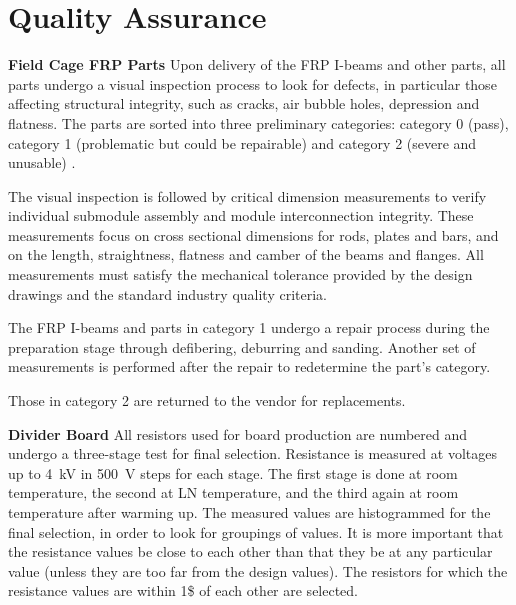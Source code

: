 \section{Quality Assurance}
\label{sec:fddp-hv-qa}

{\bf Field Cage FRP Parts} Upon delivery of the FRP I-beams and other parts, all parts undergo a visual inspection process to look for defects, in particular those affecting structural integrity, such as cracks, air bubble holes, depression and flatness. The parts are sorted into three preliminary categories: category 0 (pass), category 1 (problematic but could be repairable) and category 2 (severe and unusable) .

The visual inspection is followed by critical dimension measurements to verify individual submodule assembly and module interconnection integrity.  These measurements focus on cross sectional dimensions for rods, plates and bars, and on the length, straightness, flatness and camber of the beams and flanges.
All measurements must satisfy the mechanical tolerance provided by the design drawings and the standard industry quality criteria.

The FRP I-beams and parts in category 1 undergo a repair process during the preparation stage through defibering, deburring and sanding.  Another set of measurements is performed after the repair to redetermine the part's category.

Those in category 2 are returned to the vendor for replacements.

{\bf {} Divider Board}
All resistors used for board production are numbered and undergo a three-stage  test for final selection. Resistance is measured at voltages up to \SI{4}{kV} in \SI{500}{V} steps for each stage. The first stage is done at  room temperature, the second at LN temperature, and the third again at room temperature after warming up.  The measured values are histogrammed for the final selection, in order to look for groupings of values.   
It is more important that the resistance values be close to each other than that they be at any particular value (unless they are too far from the design values). The resistors for which the resistance values are within 1\$ of each other are selected.   

